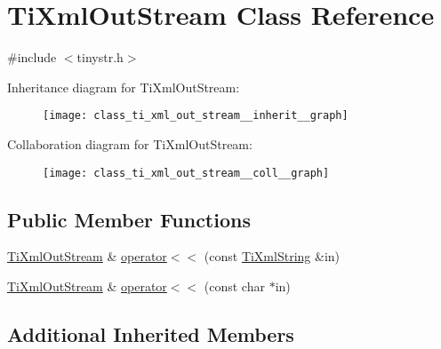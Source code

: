 \hypertarget{class_ti_xml_out_stream}{\section{Ti\+Xml\+Out\+Stream Class Reference}
\label{class_ti_xml_out_stream}
}


{\ttfamily \#include $<$tinystr.\+h$>$}



Inheritance diagram for Ti\+Xml\+Out\+Stream\+:\nopagebreak
\begin{figure}[H]
\begin{center}
\leavevmode
\texttt{[image: class\_ti\_xml\_out\_stream\_\_inherit\_\_graph]}
\end{center}
\end{figure}


Collaboration diagram for Ti\+Xml\+Out\+Stream\+:\nopagebreak
\begin{figure}[H]
\begin{center}
\leavevmode
\texttt{[image: class\_ti\_xml\_out\_stream\_\_coll\_\_graph]}
\end{center}
\end{figure}
\subsection*{Public Member Functions}
\begin{DoxyCompactItemize}
\item 
\hyperlink{class_ti_xml_out_stream}{Ti\+Xml\+Out\+Stream} \& \hyperlink{class_ti_xml_out_stream_a3640dcb1c0903be3bc6966cdc9a79db6}{operator$<$$<$} (const \hyperlink{class_ti_xml_string}{Ti\+Xml\+String} \&in)
\item 
\hyperlink{class_ti_xml_out_stream}{Ti\+Xml\+Out\+Stream} \& \hyperlink{class_ti_xml_out_stream_af2117e5a8cbfcb69544804ad2859bfb6}{operator$<$$<$} (const char $\ast$in)
\end{DoxyCompactItemize}
\subsection*{Additional Inherited Members}


